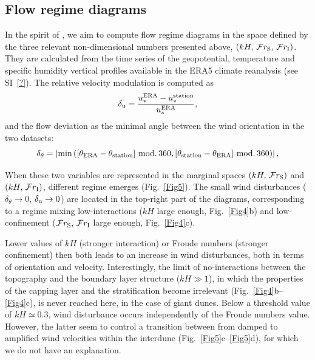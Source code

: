   \subsection{Flow regime diagrams}

  In the spirit of \citet{Sheridan2006}, we aim to compute flow regime diagrams in the space defined by the three relevant non-dimensional numbers presented above, $\left(k H,\, \mathcal{F}r_{\textup{S}}, \, \mathcal{F}r_{\textup{I}}\right)$. They are calculated from the time series of the geopotential, temperature and specific humidity vertical profiles available in the ERA5 climate reanalysis (see SI~\ref{?}). The relative velocity modulation is computed as
  \begin{equation}
    \delta_{\textup{u}} = \frac{u_{*}^{\textup{ERA}} -  u_{*}^{\textup{station}}}{u_{*}^{\textup{ERA}}},
  \end{equation}
  and the flow deviation as the minimal angle between the wind orientation in the two datasets:
  \begin{equation}
    \delta_{\theta} = \left\vert \textup{min}\left(\left[\theta_{\textup{ERA}} - \theta_{\textup{station}}\right] \, \textup{mod.} \, 360, \left[\theta_{\textup{station}} - \theta_{\textup{ERA}}\right] \, \textup{mod.} \, 360\right) \right\vert,
  \end{equation}

  When these two variables are represented in the marginal spaces $(k H,\, \mathcal{F}r_{\textup{S}})$ and $(k H,\, \mathcal{F}r_{\textup{I}})$, different regime emerges (Fig.~\ref{Fig5}). The small wind disturbances ($\delta_{\theta} \to 0$, $\delta_{\textup{u}} \to 0$) are located in the top-right part of the diagrams, corresponding to a regime mixing low-interactions ($k H$ large enough, Fig.~\ref{Fig4}b) and low-confinement ($\mathcal{F}r_{\textup{S}}, \, \mathcal{F}r_{\textup{I}}$ large enough, Fig.~\ref{Fig4}c).

  Lower values of $k H$ (stronger interaction) or Froude numbers (stronger confinement) then both leads to an increase in wind disturbances, both in terms of orientation and velocity. Interestingly, the limit of no-interactions between the topography and the boundary layer structure ($k H \gg 1$), in which the properties of the capping layer and the stratification become irrelevant (Fig.~\ref{Fig4}b--\ref{Fig4}c), is never reached here, in the case of giant dunes.
  Below a threshold value of $k H \simeq 0.3$, wind disturbance occurs independently of the Froude numbers value. However, the latter seem to control a transition between from damped to amplified wind velocities within the interdune (Fig.~\ref{Fig5}c--\ref{Fig5}d), for which we do not have an explanation.



